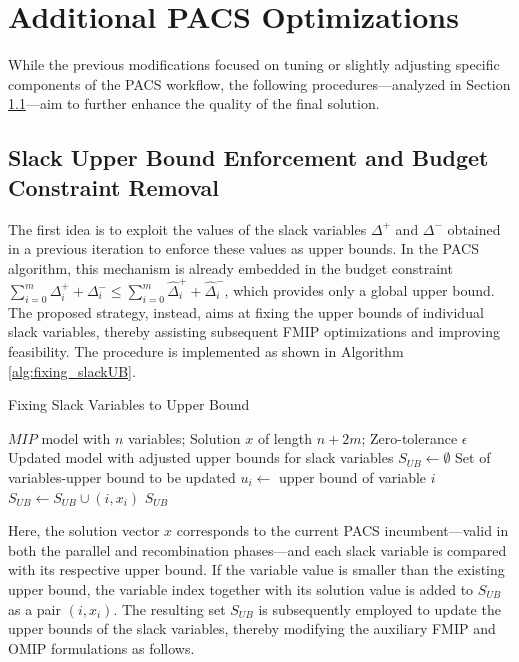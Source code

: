 \section{Additional PACS Optimizations}
While the previous modifications focused on tuning or slightly adjusting specific components of the PACS workflow, the following procedures—analyzed in Section \ref{}—aim to further enhance the quality of the final solution.

\subsection{Slack Upper Bound Enforcement and Budget Constraint Removal}
The first idea is to exploit the values of the slack variables $\Delta^+$ and $\Delta^-$ obtained in a previous iteration to enforce these values as upper bounds.  
In the PACS algorithm, this mechanism is already embedded in the budget constraint $\sum_{i=0}^m \Delta_i^{+}+\Delta_i^{-} \le \sum_{i=0}^m \hat\Delta_i^{+}+\hat\Delta_i^{-}$, which provides only a global upper bound. The proposed strategy, instead, aims at fixing the upper bounds of individual slack variables, thereby assisting subsequent FMIP optimizations and improving feasibility.  
The procedure is implemented as shown in Algorithm \ref{alg:fixing_slackUB}.  
\begin{algorithm}[H]
\caption{Fixing Slack Variables to Upper Bound}\label{alg:fixing_slackUB}
\begin{algorithmic}[1]
\Require $MIP$ model with $n$ variables; Solution $x$ of length $n+2m$; Zero-tolerance $\epsilon$
\Ensure Updated model with adjusted upper bounds for slack variables
    \State $S_{UB} \gets \emptyset$ \Comment Set of variables-upper bound to be updated
        \State $u_i \gets$ upper bound of variable $i$
            \State $S_{UB} \gets  S_{UB} \cup (i,x_i)$
        \EndIf
    \EndFor
    \State \Return $S_{UB}$
\EndFunction
\end{algorithmic}
\end{algorithm}
Here, the solution vector $x$ corresponds to the current PACS incumbent—valid in both the parallel and recombination phases—and each slack variable is compared with its respective upper bound. If the variable value is smaller than the existing upper bound, the variable index together with its solution value is added to $S_{UB}$ as a pair $(i, x_i)$.
The resulting set $S_{UB}$ is subsequently employed to update the upper bounds of the slack variables, thereby modifying the auxiliary FMIP and OMIP formulations as follows.

